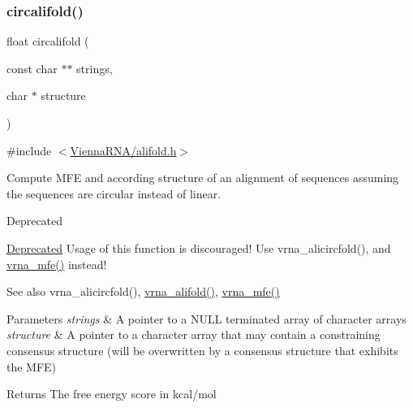 \subsubsection{\texorpdfstring{circalifold()}{circalifold()}}
{\footnotesize\ttfamily float circalifold (\begin{DoxyParamCaption}\item[{const char $\ast$$\ast$}]{strings,  }\item[{char $\ast$}]{structure }\end{DoxyParamCaption})}



{\ttfamily \#include $<$\hyperlink{alifold_8h}{Vienna\+R\+N\+A/alifold.\+h}$>$}



Compute M\+FE and according structure of an alignment of sequences assuming the sequences are circular instead of linear. 

\begin{DoxyRefDesc}{Deprecated}
\item[\hyperlink{deprecated__deprecated000013}{Deprecated}]Usage of this function is discouraged! Use vrna\+\_\+alicircfold(), and \hyperlink{group__mfe__fold_gabd3b147371ccf25c577f88bbbaf159fd}{vrna\+\_\+mfe()} instead! \end{DoxyRefDesc}
\begin{DoxySeeAlso}{See also}
vrna\+\_\+alicircfold(), \hyperlink{group__consensus__mfe__fold_ga6c9d3bef3e92c6d423ffac9f981418c1}{vrna\+\_\+alifold()}, \hyperlink{group__mfe__fold_gabd3b147371ccf25c577f88bbbaf159fd}{vrna\+\_\+mfe()}
\end{DoxySeeAlso}

\begin{DoxyParams}{Parameters}
{\em strings} & A pointer to a N\+U\+LL terminated array of character arrays \\
\hline
{\em structure} & A pointer to a character array that may contain a constraining consensus structure (will be overwritten by a consensus structure that exhibits the M\+FE) \\
\hline
\end{DoxyParams}
\begin{DoxyReturn}{Returns}
The free energy score in kcal/mol 
\end{DoxyReturn}
\mbox{\label{group__consensus__mfe__fold_ga72095e4554b5d577250ea14c42acc49e}} 
